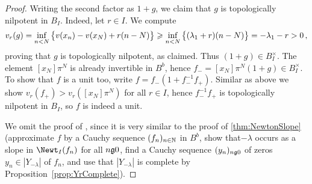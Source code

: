 \begin{proof}
	Writing the second factor as $1+g$, we claim that $g$ is topologically nilpotent in $B_I$. Indeed, let $r\in I$. We compute
	\begin{equation*}
		v_r(g)=\mathop{\operatorname{\mathrm{inf}}}_{n<N}\big\{v(x_n)-v(x_N)+r(n-N)\big\}\geqslant \mathop{\operatorname{\mathrm{inf}}}_{n<N}\big\{(\lambda_1+r)(n-N)\big\}=-\lambda_1-r>0\,,
	\end{equation*}
	proving that $g$ is topologically nilpotent, as claimed. Thus $(1+g)\in B_I^\times$. The element $[x_N]\pi^N$ is already invertible in $B^b$, hence $f_-=[x_N]\pi^N(1+g)\in B_I^\times$. To show that $f$ is a unit too, write $f=f_-(1+f_-^{-1}f_+)$. Similar as above we show $v_r(f_+)>v_r([x_N]\pi^N)$ for all $r\in I$, hence $f_-^{-1}f_+$ is topologically nilpotent in $B_I$, so $f$ is indeed a unit.
	
	We omit the proof of , since it is very similar to the proof of \cref{thm:NewtonSlope} (approximate $f$ by a Cauchy sequence $(f_n)_{n\in\mathbb{N}}$ in $B^b$, show that$-\lambda$ occurs as a slope in $\Newt_I(f_n)$ for all $n\gge 0$, find a Cauchy sequence $(y_n)_{n\gge 0}$ of zeros $y_n\in |Y_{-\lambda}|$ of $f_n$, and use that $|Y_{-\lambda}|$ is complete by Proposition~\cref{prop:YrComplete}).
\end{proof}
